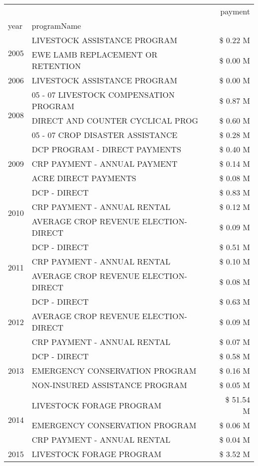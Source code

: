 \begin{tabular}{llr}
\toprule
 &  & payment \\
year & programName &  \\
\midrule
\multirow[t]{2}{*}{2005} & LIVESTOCK ASSISTANCE PROGRAM & \$ 0.22 M \\
 & EWE LAMB REPLACEMENT OR RETENTION & \$ 0.00 M \\
\cline{1-3}
2006 & LIVESTOCK ASSISTANCE PROGRAM & \$ 0.00 M \\
\cline{1-3}
\multirow[t]{3}{*}{2008} & 05 - 07 LIVESTOCK COMPENSATION PROGRAM & \$ 0.87 M \\
 & DIRECT AND COUNTER CYCLICAL PROG & \$ 0.60 M \\
 & 05 - 07 CROP DISASTER ASSISTANCE & \$ 0.28 M \\
\cline{1-3}
\multirow[t]{3}{*}{2009} & DCP PROGRAM - DIRECT PAYMENTS & \$ 0.40 M \\
 & CRP PAYMENT - ANNUAL PAYMENT & \$ 0.14 M \\
 & ACRE DIRECT PAYMENTS & \$ 0.08 M \\
\cline{1-3}
\multirow[t]{3}{*}{2010} & DCP - DIRECT & \$ 0.83 M \\
 & CRP PAYMENT - ANNUAL RENTAL & \$ 0.12 M \\
 & AVERAGE CROP REVENUE ELECTION-DIRECT & \$ 0.09 M \\
\cline{1-3}
\multirow[t]{3}{*}{2011} & DCP - DIRECT & \$ 0.51 M \\
 & CRP PAYMENT - ANNUAL RENTAL & \$ 0.10 M \\
 & AVERAGE CROP REVENUE ELECTION-DIRECT & \$ 0.08 M \\
\cline{1-3}
\multirow[t]{3}{*}{2012} & DCP - DIRECT & \$ 0.63 M \\
 & AVERAGE CROP REVENUE ELECTION-DIRECT & \$ 0.09 M \\
 & CRP PAYMENT - ANNUAL RENTAL & \$ 0.07 M \\
\cline{1-3}
\multirow[t]{3}{*}{2013} & DCP - DIRECT & \$ 0.58 M \\
 & EMERGENCY CONSERVATION PROGRAM & \$ 0.16 M \\
 & NON-INSURED ASSISTANCE PROGRAM & \$ 0.05 M \\
\cline{1-3}
\multirow[t]{3}{*}{2014} & LIVESTOCK FORAGE PROGRAM & \$ 51.54 M \\
 & EMERGENCY CONSERVATION PROGRAM & \$ 0.06 M \\
 & CRP PAYMENT - ANNUAL RENTAL & \$ 0.04 M \\
\cline{1-3}
\multirow[t]{3}{*}{2015} & LIVESTOCK FORAGE PROGRAM & \$ 3.52 M \\

\end{tabular}
